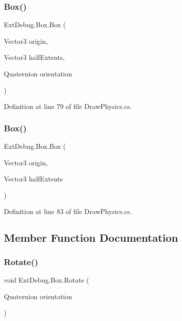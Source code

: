 \subsubsection{\texorpdfstring{Box()}{Box()}\hspace{0.1cm}{\footnotesize\ttfamily [1/2]}}
{\footnotesize\ttfamily Ext\+Debug.\+Box.\+Box (\begin{DoxyParamCaption}\item[{Vector3}]{origin,  }\item[{Vector3}]{half\+Extents,  }\item[{Quaternion}]{orientation }\end{DoxyParamCaption})}



Definition at line 79 of file Draw\+Physics.\+cs.

\mbox{\label{struct_ext_debug_1_1_box_aa801e1ffbe8f7f516126bc49a5dcd5e5}} 
\subsubsection{\texorpdfstring{Box()}{Box()}\hspace{0.1cm}{\footnotesize\ttfamily [2/2]}}
{\footnotesize\ttfamily Ext\+Debug.\+Box.\+Box (\begin{DoxyParamCaption}\item[{Vector3}]{origin,  }\item[{Vector3}]{half\+Extents }\end{DoxyParamCaption})}



Definition at line 83 of file Draw\+Physics.\+cs.



\subsection{Member Function Documentation}
\mbox{\label{struct_ext_debug_1_1_box_ae76be224e6a60930f3ede6b37502e537}} 
\subsubsection{\texorpdfstring{Rotate()}{Rotate()}}
{\footnotesize\ttfamily void Ext\+Debug.\+Box.\+Rotate (\begin{DoxyParamCaption}\item[{Quaternion}]{orientation }\end{DoxyParamCaption})}



